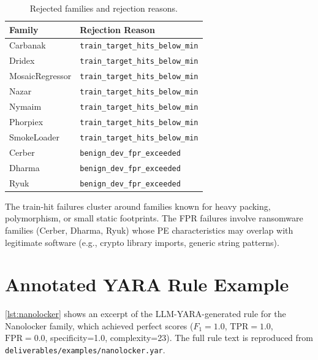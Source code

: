 \documentclass[10pt,twocolumn]{article}
\newcommand{\sysname}{\textsc{LLM-YARA}\xspace}
\begin{document}
\begin{table}[h]
\centering
\caption{Rejected families and rejection reasons.}
\label{tab:rejected}
\small
\begin{tabular}{@{}ll@{}}
\toprule
\textbf{Family} & \textbf{Rejection Reason} \\
\midrule
Carbanak        & \texttt{train\_target\_hits\_below\_min} \\
Dridex          & \texttt{train\_target\_hits\_below\_min} \\
MosaicRegressor & \texttt{train\_target\_hits\_below\_min} \\
Nazar           & \texttt{train\_target\_hits\_below\_min} \\
Nymaim          & \texttt{train\_target\_hits\_below\_min} \\
Phorpiex        & \texttt{train\_target\_hits\_below\_min} \\
SmokeLoader     & \texttt{train\_target\_hits\_below\_min} \\
\midrule
Cerber          & \texttt{benign\_dev\_fpr\_exceeded} \\
Dharma          & \texttt{benign\_dev\_fpr\_exceeded} \\
Ryuk            & \texttt{benign\_dev\_fpr\_exceeded} \\
\bottomrule
\end{tabular}
\end{table}

The train-hit failures cluster around families known for heavy
packing, polymorphism, or small static footprints.  The FPR failures
involve ransomware families (Cerber, Dharma, Ryuk) whose PE
characteristics may overlap with legitimate software (e.g., crypto
library imports, generic string patterns).

\section{Annotated YARA Rule Example}
\label{app:rule}

\cref{lst:nanolocker} shows an excerpt of the \sysname-generated rule for the
Nanolocker family, which achieved perfect scores ($F_1=1.0$,
$\text{TPR}=1.0$, $\text{FPR}=0.0$, specificity=1.0, complexity=23).
The full rule text is reproduced from
\texttt{deliverables/examples/nanolocker.yar}.
\end{document}
